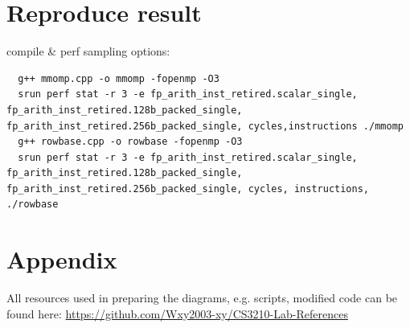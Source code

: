 \documentclass[9pt]{extarticle}
\begin{document}
\begin{minipage}{0.45\linewidth}
  \noindent{}
\end{minipage}\hfill
\begin{minipage}{0.5\linewidth}
  \noindent{}
\end{minipage}\hfill
\par\vspace{-2ex}
\section*{Reproduce result}
compile \& perf sampling options:
\begin{lstlisting}
  g++ mmomp.cpp -o mmomp -fopenmp -O3
  srun perf stat -r 3 -e fp_arith_inst_retired.scalar_single, fp_arith_inst_retired.128b_packed_single, fp_arith_inst_retired.256b_packed_single, cycles,instructions ./mmomp
  g++ rowbase.cpp -o rowbase -fopenmp -O3
  srun perf stat -r 3 -e fp_arith_inst_retired.scalar_single, fp_arith_inst_retired.128b_packed_single, fp_arith_inst_retired.256b_packed_single, cycles, instructions, ./rowbase
\end{lstlisting}
\section*{Appendix}

All resources used in preparing the diagrams, e.g. scripts, modified code can be found here: 
\href{https://github.com/Wxy2003-xy/CS3210-Lab-References}{https://github.com/Wxy2003-xy/CS3210-Lab-References}
\end{document}
